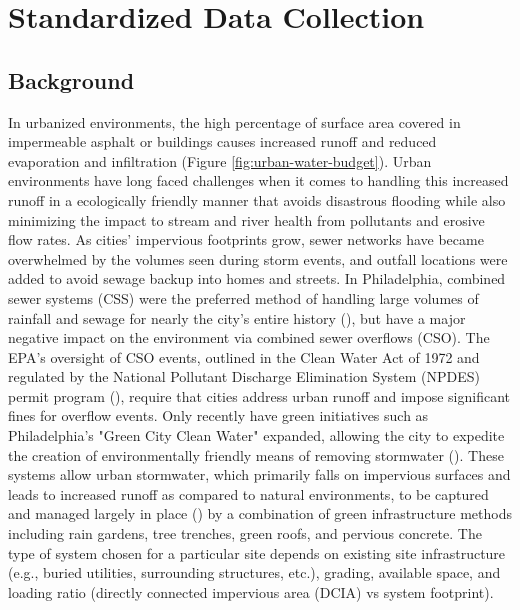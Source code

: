 %
\chapter{Standardized Data Collection}
\label{sec:data-collection}


\section{Background}

In urbanized environments, the high percentage of surface area covered in impermeable asphalt or buildings causes increased runoff and reduced evaporation and infiltration (Figure \ref{fig:urban-water-budget}).
Urban environments have long faced challenges when it comes to handling this increased runoff in a ecologically friendly manner that avoids disastrous flooding while also minimizing the impact to stream and river health from pollutants and erosive flow rates.
As cities' impervious footprints grow, sewer networks have became overwhelmed by the volumes seen during storm events, and outfall locations were added to avoid sewage backup into homes and streets.
In Philadelphia, combined sewer systems (CSS)  were the preferred method of handling large volumes of rainfall and sewage for nearly the city's entire history (\cite{Akhavan2015}), but have a major negative impact on the environment via combined sewer overflows (CSO).
The EPA's oversight of CSO events, outlined in the Clean Water Act of 1972 and regulated by the National Pollutant Discharge Elimination System (NPDES) permit program (\cite{USEPA2009}), require that cities address urban runoff and impose significant fines for overflow events.
Only recently have green initiatives such as Philadelphia's "Green City Clean Water" expanded, allowing the city to expedite the creation of environmentally friendly means of removing stormwater (\cite{PhiladelphiaWaterDepartment2018a, Callahan2019}).
These systems allow urban stormwater, which primarily falls on impervious surfaces and leads to increased runoff as compared to natural environments, to be captured and managed largely in place (\cite{Heffernan2016}) by a combination of green infrastructure methods including rain gardens, tree trenches, green roofs, and pervious concrete.
The type of system chosen for a particular site depends on existing site infrastructure (e.g., buried utilities, surrounding structures, etc.), grading, available space, and loading ratio (directly connected impervious area (DCIA) vs system footprint).

